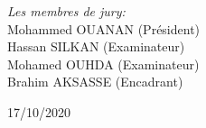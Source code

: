 \documentclass[
openany,
11pt, %
french, %
singlespacing, %
headsepline, %
]{MastersDoctoralThesis} %
\begin{document}
\begin{titlepage}
\begin{center}
\begin{center} \large
	\emph{Les membres de jury:}\\
	
	Mohammed OUANAN (Président)\\
	Hassan SILKAN (Examinateur)\\
	Mohamed OUHDA (Examinateur)\\
	\small
	Brahim AKSASSE (Encadrant)
\end{center}
 


 
\vfill

{\large 17/10/2020}\\[4cm] %
 
\vfill
\end{center}
\end{titlepage}


\end{document}
